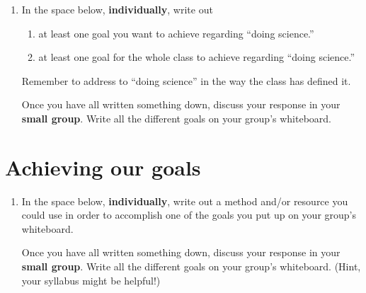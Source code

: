 \begin{enumerate}
	\item In the space below, \textbf{individually}, write out 
	\begin{enumerate}
		\item at least one goal you want to achieve regarding ``doing science.''
		\item at least one goal for the whole class to achieve regarding ``doing science.''
	\end{enumerate}
	Remember to address to ``doing science'' in the way the class has defined it.
	
	\vspace{2in}
	
	Once you have all written something down, discuss your response in your \textbf{small group}. Write all the different goals on your group's whiteboard.
\end{enumerate}

\WCD

\section{Achieving our goals}

\begin{enumerate}
	\item In the space below, \textbf{individually}, write out a method and/or resource you could use in order to accomplish one of the goals you put up on your group's whiteboard.
	
	\vspace{2in}
	
	Once you have all written something down, discuss your response in your \textbf{small group}. Write all the different goals on your group's whiteboard. (Hint, your syllabus might be helpful!)
\end{enumerate}

\WCD